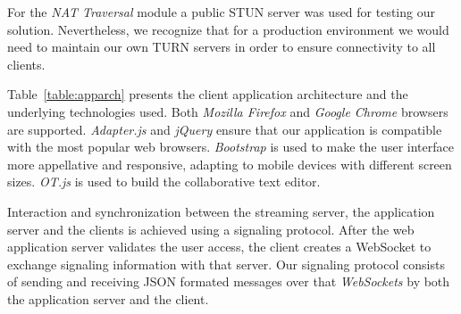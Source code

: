 \documentclass[10pt,conference]{IEEEtran}
\begin{document}
For the \emph{NAT Traversal} module a public \gls{STUN} server was used for testing our solution.
Nevertheless, we recognize that for a production environment we would need to maintain our own \gls{TURN} servers in order to ensure connectivity to all clients.




Table~\ref{table:apparch} presents the client application architecture and the underlying technologies used.
Both \emph{Mozilla Firefox} and \emph{Google Chrome} browsers are supported.
\emph{Adapter.js} and \emph{jQuery} ensure that our application is compatible with the most popular web browsers.
\emph{Bootstrap} is used to make the user interface more appellative and responsive, adapting to mobile devices with different screen sizes.
\emph{OT.js} is used to build the collaborative text editor.


\begin{table}
\centering
	\caption{Application Architecture}
	\label{table:apparch}

\end{table}



Interaction and synchronization between the streaming server, the application server and the clients is achieved using a signaling protocol.
After the web application server validates the user access, the client creates a WebSocket to exchange signaling information with that server. 
Our signaling protocol consists of sending and receiving \gls{JSON} formated messages over that \emph{WebSockets} by both the application server and the client. 
\end{document}
